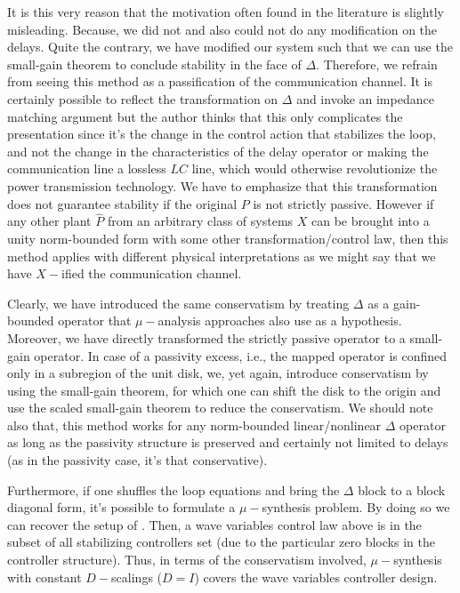 It is this very reason that the motivation often found in the literature is slightly misleading. Because, we did not 
and also could not do any modification on the delays. Quite the contrary, we have modified our system such that we can use 
the small-gain theorem to conclude stability in the face of $\Delta$. Therefore, we refrain from seeing 
this method as a passification of the communication channel. It is certainly possible to reflect the transformation 
on $\Delta$ and invoke an impedance matching argument but the author thinks that this 
only complicates the presentation since it's the change in the control action that stabilizes the loop, and not the 
change in the characteristics of the delay operator or making the communication line a lossless $LC$ line, which 
would otherwise revolutionize the power transmission technology.
We have to emphasize that this transformation does not guarantee stability if the original $P$ is not strictly passive.
However if any other plant $\hat{P}$ from an arbitrary class of systems $X$ can be brought into a unity norm-bounded form 
with some other transformation/control law, then this method applies with different physical interpretations as we might 
say that we have $X-$ified the communication channel.  



Clearly, we have introduced the same conservatism by treating $\Delta$ as a gain-bounded operator 
that $\mu-$analysis approaches also use as a hypothesis. Moreover, we have directly transformed the strictly passive 
operator to a small-gain operator. In case of a passivity excess, i.e., the mapped operator is confined only 
in a subregion of the unit disk, we, yet again, introduce conservatism by using the small-gain theorem, for which 
one can shift the disk to the origin and use the scaled small-gain theorem to reduce the conservatism. We should 
note also that, this method works for any norm-bounded linear/nonlinear $\Delta$ operator as long as the 
passivity structure is preserved and certainly not limited to delays (as in the passivity case, it's that conservative). 

Furthermore, if one shuffles the loop equations and bring the $\Delta$ block to a block diagonal form, it's possible
to formulate a $\mu-$synthesis problem. By doing so we can recover the setup of \cite{leungfa}. Then, a wave variables 
control law above is in the subset of all stabilizing controllers set (due 
to the particular zero blocks in the controller structure). Thus, in terms of the conservatism involved, 
$\mu-$synthesis with constant $D-$scalings ($D=I$) covers the wave variables controller design.

